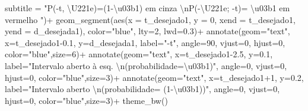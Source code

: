 \documentclass[
]{book}
\newenvironment{Shaded}{\begin{snugshade}}{\end{snugshade}}
\newcommand{\AttributeTok}[1]{\textcolor[rgb]{0.77,0.63,0.00}{#1}}
\newcommand{\DecValTok}[1]{\textcolor[rgb]{0.00,0.00,0.81}{#1}}
\newcommand{\FloatTok}[1]{\textcolor[rgb]{0.00,0.00,0.81}{#1}}
\newcommand{\FunctionTok}[1]{\textcolor[rgb]{0.00,0.00,0.00}{#1}}
\newcommand{\NormalTok}[1]{#1}
\newcommand{\SpecialCharTok}[1]{\textcolor[rgb]{0.00,0.00,0.00}{#1}}
\newcommand{\StringTok}[1]{\textcolor[rgb]{0.31,0.60,0.02}{#1}}
\begin{document}
\begin{Shaded}
\begin{Highlighting}[]
       \AttributeTok{subtitle =} \StringTok{"P({-}t, \textbackslash{}U221e)=(1{-}\textbackslash{}u03b1) em cinza }\SpecialCharTok{\textbackslash{}n}\StringTok{P({-}\textbackslash{}U221e; {-}t)= \textbackslash{}u03b1 em vermelho "}\NormalTok{)}\SpecialCharTok{+}
  \FunctionTok{geom\_segment}\NormalTok{(}\FunctionTok{aes}\NormalTok{(}\AttributeTok{x =}\NormalTok{ t\_desejado1, }\AttributeTok{y =} \DecValTok{0}\NormalTok{, }\AttributeTok{xend =}\NormalTok{ t\_desejado1, }\AttributeTok{yend =}\NormalTok{ d\_desejada1), }\AttributeTok{color=}\StringTok{"blue"}\NormalTok{, }\AttributeTok{lty=}\DecValTok{2}\NormalTok{, }\AttributeTok{lwd=}\FloatTok{0.3}\NormalTok{)}\SpecialCharTok{+}
  \FunctionTok{annotate}\NormalTok{(}\AttributeTok{geom=}\StringTok{"text"}\NormalTok{, }\AttributeTok{x=}\NormalTok{t\_desejado1}\FloatTok{{-}0.1}\NormalTok{, }\AttributeTok{y=}\NormalTok{d\_desejada1, }\AttributeTok{label=}\StringTok{"{-}t"}\NormalTok{, }\AttributeTok{angle=}\DecValTok{90}\NormalTok{, }\AttributeTok{vjust=}\DecValTok{0}\NormalTok{, }\AttributeTok{hjust=}\DecValTok{0}\NormalTok{, }\AttributeTok{color=}\StringTok{"blue"}\NormalTok{,}\AttributeTok{size=}\DecValTok{6}\NormalTok{)}\SpecialCharTok{+}
  \FunctionTok{annotate}\NormalTok{(}\AttributeTok{geom=}\StringTok{"text"}\NormalTok{, }\AttributeTok{x=}\NormalTok{t\_desejado1}\FloatTok{{-}2.5}\NormalTok{, }\AttributeTok{y=}\FloatTok{0.1}\NormalTok{, }\AttributeTok{label=}\StringTok{"Intervalo aberto à esq. }\SpecialCharTok{\textbackslash{}n}\StringTok{(probabilidade=\textbackslash{}u03b1)"}\NormalTok{, }\AttributeTok{angle=}\DecValTok{0}\NormalTok{, }\AttributeTok{vjust=}\DecValTok{0}\NormalTok{, }\AttributeTok{hjust=}\DecValTok{0}\NormalTok{, }\AttributeTok{color=}\StringTok{"blue"}\NormalTok{,}\AttributeTok{size=}\DecValTok{3}\NormalTok{)}\SpecialCharTok{+}
  \FunctionTok{annotate}\NormalTok{(}\AttributeTok{geom=}\StringTok{"text"}\NormalTok{, }\AttributeTok{x=}\NormalTok{t\_desejado1}\SpecialCharTok{+}\DecValTok{1}\NormalTok{, }\AttributeTok{y=}\FloatTok{0.2}\NormalTok{, }\AttributeTok{label=}\StringTok{"Intervalo aberto }\SpecialCharTok{\textbackslash{}n}\StringTok{(probabilidade= (1{-}\textbackslash{}u03b1))"}\NormalTok{, }\AttributeTok{angle=}\DecValTok{0}\NormalTok{, }\AttributeTok{vjust=}\DecValTok{0}\NormalTok{, }\AttributeTok{hjust=}\DecValTok{0}\NormalTok{, }\AttributeTok{color=}\StringTok{"blue"}\NormalTok{,}\AttributeTok{size=}\DecValTok{3}\NormalTok{)}\SpecialCharTok{+}  \FunctionTok{theme\_bw}\NormalTok{()}
\end{Highlighting}
\end{Shaded}
\end{document}
